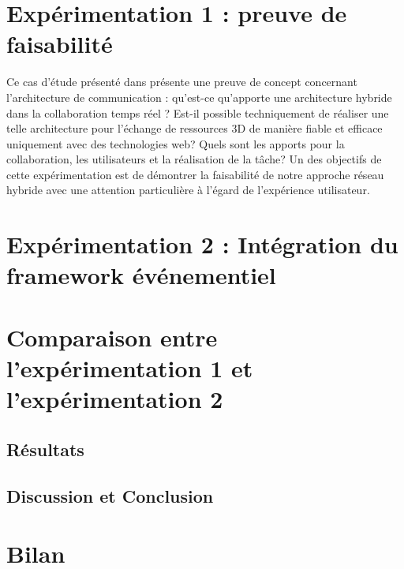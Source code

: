 \section{Expérimentation 1 : preuve de faisabilité}

Ce cas d'étude présenté dans \cite{Desprat2015a, Desprat2015b} présente 
une preuve de concept concernant l'architecture de communication : qu'est-ce 
qu'apporte une architecture hybride dans la collaboration temps réel ? Est-il 
possible techniquement de réaliser une 
telle architecture pour l'échange de ressources 3D de manière fiable et efficace 
uniquement avec des technologies web? Quels sont les apports pour la 
collaboration, les utilisateurs et la réalisation de la tâche?
Un des objectifs de cette expérimentation est de démontrer la faisabilité de notre 
approche réseau hybride avec une attention particulière à l'égard de l'expérience 
utilisateur.



\section{Expérimentation 2 : Intégration du framework événementiel}
\label{sec:us}






\section{Comparaison entre l'expérimentation 1 et l'expérimentation 2}
\subsection{Résultats}
\subsection{Discussion et Conclusion}
\section{Bilan}